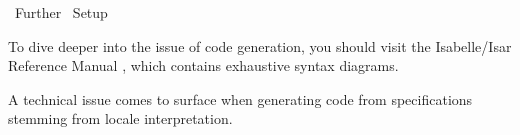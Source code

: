 %
\begin{isabellebody}%
\def\isabellecontext{Further}%
%
\isadelimtheory
%
\endisadelimtheory
%
\isatagtheory
{}\isamarkupfalse%
\ Further\isanewline
{}\ Setup\isanewline
{}%
\endisatagtheory
{\isafoldtheory}%
%
\isadelimtheory
%
\endisadelimtheory
%
\isamarkuptrue%
%
\isamarkuptrue%
%
\begin{isamarkuptext}%
To dive deeper into the issue of code generation, you should visit
  the Isabelle/Isar Reference Manual \cite{isabelle-isar-ref}, which
  contains exhaustive syntax diagrams.%
\end{isamarkuptext}%
\isamarkuptrue%
%
\isamarkuptrue%
%
\begin{isamarkuptext}%
A technical issue comes to surface when generating code from
  specifications stemming from locale interpretation.


\end{isamarkuptext}
\end{isabellebody}
